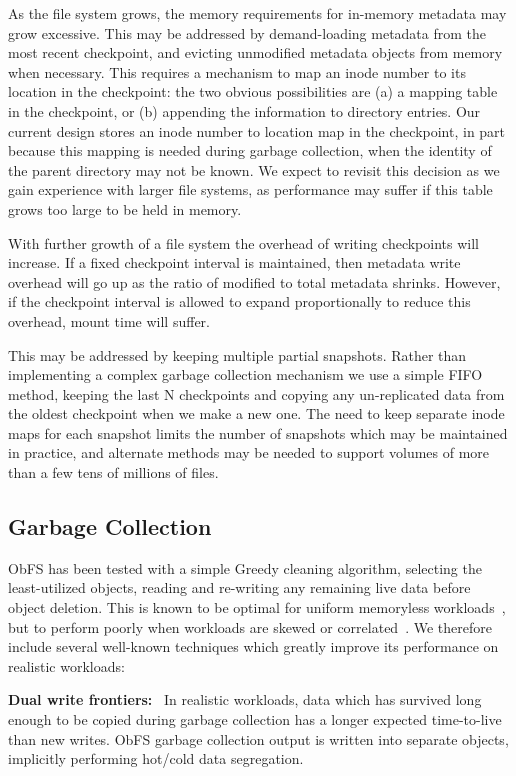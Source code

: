 As the file system grows, the memory requirements for in-memory metadata may grow excessive.
This may be addressed by demand-loading metadata from the most recent checkpoint, and evicting unmodified metadata objects from memory when necessary.
This requires a mechanism to map an inode number to its location in the checkpoint: the two obvious possibilities are (a) a mapping table in the checkpoint, or (b) appending the information to directory entries.
Our current design stores an inode number to location map in the checkpoint, in part because this mapping is needed during garbage collection, when the identity of the parent directory may not be known.
We expect to revisit this decision as we gain experience with larger file systems, as performance may suffer if this table grows too large to be held in memory.

With further growth of a file system the overhead of writing checkpoints will increase.
If a fixed checkpoint interval is maintained, then metadata write overhead will go up as the ratio of modified to total metadata shrinks.
However, if the checkpoint interval is allowed to expand proportionally to reduce this overhead, mount time will suffer.

This may be addressed by keeping multiple partial snapshots.
Rather than implementing a complex garbage collection mechanism we use a simple FIFO method, keeping the last N checkpoints and copying any un-replicated data from the oldest checkpoint when we make a new one.
The need to keep separate inode maps for each snapshot limits the number of snapshots which may be maintained in practice, and alternate methods may be needed to support volumes of more than a few tens of millions of files.

\subsection{Garbage Collection}

ObFS has been tested with a simple Greedy cleaning algorithm, selecting the least-utilized objects, reading and re-writing any remaining live data before object deletion.
This is known to be optimal for uniform memoryless workloads~\cite{yang_optimality_2015}, but to perform poorly when workloads are skewed or correlated~\cite{desnoyers_analytic_2014}. 
We therefore include several well-known techniques which greatly improve its performance on realistic workloads:

\textbf{Dual write frontiers:}~\cite{lin_dual_2012} In realistic workloads, data which has survived long enough to be copied during garbage collection has a longer expected time-to-live than new writes.
  ObFS garbage collection output is written into separate objects, implicitly performing hot/cold data segregation.

